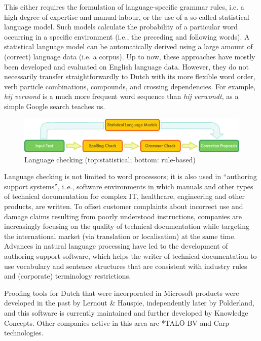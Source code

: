 \documentclass[]{../../metanetpaper}
\begin{document}
\begin{multicols}{2}
 This either requires the formulation of language-specific grammar rules, i.e. a high degree of expertise and manual labour, or the use of a so-called statistical language model.  Such models calculate the probability of a particular word occurring in a specific environment (i.e., the preceding and following words).  A statistical language model can be automatically derived using a large amount of (correct) language data (i.e. a corpus). Up to now, these approaches have mostly been developed and evaluated on English language data. However, they do not necessarily transfer straightforwardly to Dutch with its more flexible word order, verb particle combinations, compounds, and crossing dependencies. For example, \textit{hij verwond} is a much more frequent word sequence than \textit{hij verwondt}, as a simple Google search teaches us.

\begin{figure}[htb]
  \center
  \includegraphics[width=\textwidth]{../_media/english/language_checking}
  \caption{Language checking (top:statistical; bottom: rule-based)}
  \label{fig:langcheckingaarch_en}
\end{figure}

Language checking is not limited to word processors; it is also used in “authoring support systems”, i.\,e., software environments in which manuals and other types of technical documentation for complex IT, healthcare, engineering and other products, are written. To offset customer complaints about incorrect use and damage claims resulting from poorly understood instructions, companies are increasingly focusing on the quality of technical documentation while targeting the international market (via translation or localisation) at the same time. Advances in natural language processing have led to the development of authoring support software, which helps the writer of technical documentation to use vocabulary and sentence structures that are consistent with industry rules and (corporate) terminology restrictions.


Proofing tools for Dutch that were incorporated in Microsoft products were developed in the past by Lernout \& Hauspie, independently later by Polderland, and this software is currently maintained and further developed by Knowledge Concepts.  Other companies active in this area are *TAL{\=O} BV and Carp technologies.


\end{multicols}
\end{document}
